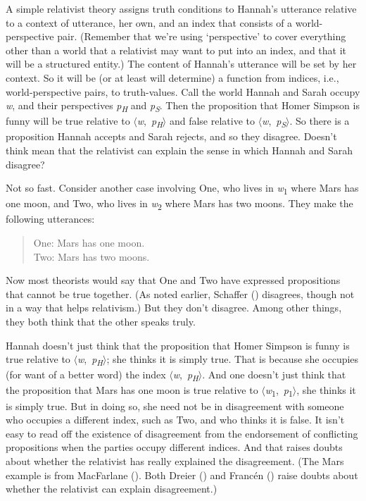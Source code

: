 \documentclass[
  11pt,
  letterpaper,
  DIV=11,
  numbers=noendperiod,
  twoside]{scrartcl}
\begin{document}
A simple relativist theory assigns truth conditions to Hannah's
utterance relative to a context of utterance, her own, and an index that
consists of a world-perspective pair. (Remember that we're using
`perspective' to cover everything other than a world that a relativist
may want to put into an index, and that it will be a structured entity.)
The content of Hannah's utterance will be set by her context. So it will
be (or at least will determine) a function from indices, i.e.,
world-perspective pairs, to truth-values. Call the world Hannah and
Sarah occupy \emph{w}, and their perspectives \emph{p\textsubscript{H}}
and \emph{p\textsubscript{S}}. Then the proposition that Homer Simpson
is funny will be true relative to
\(\langle\)\emph{w},~\emph{p\textsubscript{H}}\(\rangle\) and false
relative to \(\langle\)\emph{w},~\emph{p\textsubscript{S}}\(\rangle\).
So there is a proposition Hannah accepts and Sarah rejects, and so they
disagree. Doesn't think mean that the relativist can explain the sense
in which Hannah and Sarah disagree?

Not so fast. Consider another case involving One, who lives in
\emph{w}\textsubscript{1} where Mars has one moon, and Two, who lives in
\emph{w}\textsubscript{2} where Mars has two moons. They make the
following utterances:

\begin{quote}
One: Mars has one moon.\\
Two: Mars has two moons.
\end{quote}

Now most theorists would say that One and Two have expressed
propositions that cannot be true together. (As noted earlier, Schaffer
() disagrees, though not in a way that
helps relativism.) But they don't disagree. Among other things, they
both think that the other speaks truly.

Hannah doesn't just think that the proposition that Homer Simpson is
funny is true relative to
\(\langle\)\emph{w},~\emph{p\textsubscript{H}}\(\rangle\); she thinks it
is simply true. That is because she occupies (for want of a better word)
the index \(\langle\)\emph{w},~\emph{p\textsubscript{H}}\(\rangle\). And
one doesn't just think that the proposition that Mars has one moon is
true relative to
\(\langle\)\emph{w}\textsubscript{1},~\emph{p}\textsubscript{1}\(\rangle\),
she thinks it is simply true. But in doing so, she need not be in
disagreement with someone who occupies a different index, such as Two,
and who thinks it is false. It isn't easy to read off the existence of
disagreement from the endorsement of conflicting propositions when the
parties occupy different indices. And that raises doubts about whether
the relativist has really explained the disagreement. (The Mars example
is from MacFarlane (). Both
Dreier () and Francén
() raise doubts about whether the
relativist can explain disagreement.)
\end{document}
